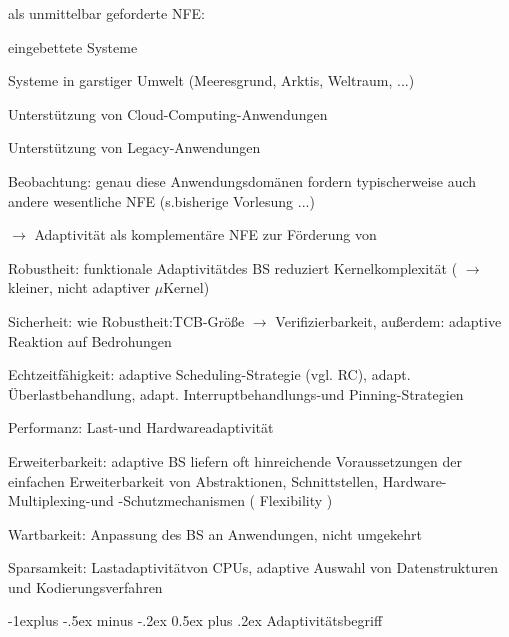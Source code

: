 \documentclass[a4paper]{article}
\makeatletter
\renewcommand{\subsection}{\@startsection{subsection}{2}{0mm}%
 {-1explus -.5ex minus -.2ex}%
 {0.5ex plus .2ex}%
 {\normalfont\normalsize\bfseries}}
\makeatother
\begin{document}
\begin{multicols}{3}
    \begin{itemize*}
        \item als unmittelbar geforderte NFE:
        \begin{itemize*}
            \item eingebettete Systeme
            \item Systeme in garstiger Umwelt (Meeresgrund, Arktis, Weltraum, ...)
            \item Unterstützung von Cloud-Computing-Anwendungen
            \item Unterstützung von Legacy-Anwendungen
        \end{itemize*}
        \item Beobachtung: genau diese Anwendungsdomänen fordern typischerweise auch
        andere wesentliche NFE (s.bisherige Vorlesung ...)
        \item $\rightarrow$ Adaptivität als komplementäre NFE zur
        Förderung von
        \begin{itemize*}
            \item Robustheit: funktionale Adaptivitätdes BS reduziert Kernelkomplexität ( $\rightarrow$ kleiner, nicht adaptiver $\mu$Kernel)
            \item Sicherheit: wie Robustheit:TCB-Größe $\rightarrow$ Verifizierbarkeit, außerdem: adaptive Reaktion auf Bedrohungen
            \item Echtzeitfähigkeit: adaptive Scheduling-Strategie (vgl. RC), adapt. Überlastbehandlung, adapt. Interruptbehandlungs-und Pinning-Strategien
            \item Performanz: Last-und Hardwareadaptivität
            \item Erweiterbarkeit: adaptive BS liefern oft hinreichende Voraussetzungen der einfachen Erweiterbarkeit von Abstraktionen, Schnittstellen, Hardware-Multiplexing-und -Schutzmechanismen ( Flexibility )
            \item Wartbarkeit: Anpassung des BS an Anwendungen, nicht umgekehrt
            \item Sparsamkeit: Lastadaptivitätvon CPUs, adaptive Auswahl von Datenstrukturen und Kodierungsverfahren
        \end{itemize*}
    \end{itemize*}


    \subsection{Adaptivitätsbegriff}


\end{multicols}
\end{document}
